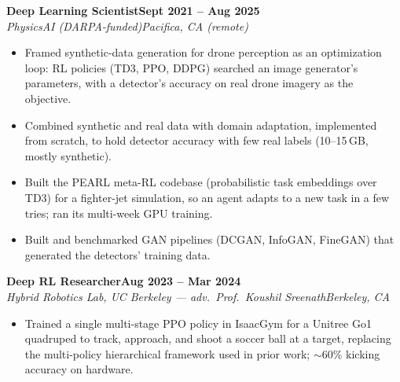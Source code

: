 \documentclass[10pt]{article}
\newcommand{\role}[4]{\par\vspace{3pt}\textbf{#1}\hfill\textbf{#2}\\\textit{#3}\hfill\textit{#4}}
\begin{document}
\role{Deep Learning Scientist}{Sept 2021 -- Aug 2025}{PhysicsAI (DARPA-funded)}{Pacifica, CA (remote)}
\begin{itemize}
\item Framed synthetic-data generation for drone perception as an optimization loop: RL policies (TD3, PPO, DDPG) searched an image generator's parameters, with a detector's accuracy on real drone imagery as the objective.
\item Combined synthetic and real data with domain adaptation, implemented from scratch, to hold detector accuracy with few real labels (10--15\,GB, mostly synthetic).
\item Built the PEARL meta-RL codebase (probabilistic task embeddings over TD3) for a fighter-jet simulation, so an agent adapts to a new task in a few tries; ran its multi-week GPU training.
\item Built and benchmarked GAN pipelines (DCGAN, InfoGAN, FineGAN) that generated the detectors' training data.
\end{itemize}

\role{Deep RL Researcher}{Aug 2023 -- Mar 2024}{Hybrid Robotics Lab, UC Berkeley --- adv.\ Prof.\ Koushil Sreenath}{Berkeley, CA}
\begin{itemize}
\item Trained a single multi-stage PPO policy in IsaacGym for a Unitree Go1 quadruped to track, approach, and shoot a soccer ball at a target, replacing the multi-policy hierarchical framework used in prior work; $\sim$60\% kicking accuracy on hardware.
\end{itemize}
\end{document}
